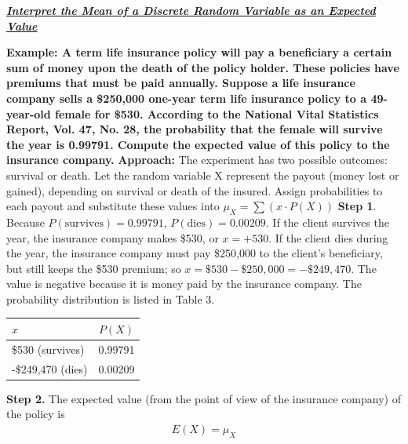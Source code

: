 \documentclass{report}
\begin{document}
    \pagebreak \bigbreak \noindent 
    \textbf{\textit{\underline{Interpret the Mean of a Discrete Random Variable as an Expected Value}}}
    \bigbreak \noindent 
    \begin{mdframed}
      \textbf{Example: A term life insurance policy will pay a beneficiary a certain sum of money upon the death of the policy holder. These policies have premiums that must be paid annually. Suppose a life insurance company sells a \$250,000 one-year term life insurance policy to a 49-year-old female for \$530. According to the National Vital Statistics Report, Vol. 47, No. 28, the probability that the female will survive the year is 0.99791. Compute the expected value of this policy to the insurance company.}
      \bigbreak \noindent 
      \textbf{Approach:}
      \bigbreak \noindent 
      The experiment has two possible outcomes: survival or death. Let the random variable X represent the payout (money lost or gained), depending on survival or death of the insured. Assign probabilities to each payout and substitute these values into $\mu_{X} = \sum (x \cdot P(X)) $
      \bigbreak \noindent 
      \textbf{Step 1}. Because $P(\text{survives}) = 0.99791$, $P(\text{dies}) = 0.00209$. If the client survives the year, the insurance company makes \$530, or $x = +530$. If the client dies during the year, the insurance company must pay \$250,000 to the client's beneficiary, but still keeps the \$530 premium; so $x = \$530 - \$250,000 = -\$249,470$. The value is negative because it is money paid by the insurance company. The probability distribution is listed in Table 3.
      \begin{center}
          \begin{center}
              \begin{tabular}{|l|c|}
              \hline
              $x$ & $ P(X)$ \\
              	\hline
               	\$530 (survives)  & 0.99791  \\
              	\hline
              	-\$249,470 (dies) &0.00209 \\
              	\hline
              \end{tabular}
          \end{center}
      \end{center}
      \bigbreak \noindent 
      \textbf{Step 2.} The expected value (from the point of view of the insurance company) of the policy is
      \begin{align*}
          E(X) = \mu_{X} \\

\end{align*}
\end{mdframed}
\end{document}
